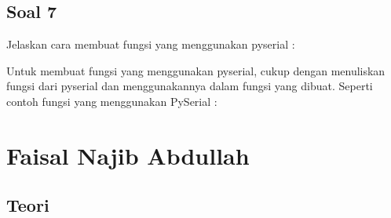 \subsection{Soal 7}
Jelaskan cara membuat fungsi yang menggunakan pyserial : 

Untuk membuat fungsi yang menggunakan pyserial, cukup dengan menuliskan fungsi dari pyserial dan menggunakannya dalam fungsi yang dibuat. Seperti contoh fungsi yang menggunakan PySerial : 


\section{Faisal Najib Abdullah}
\subsection{Teori}

